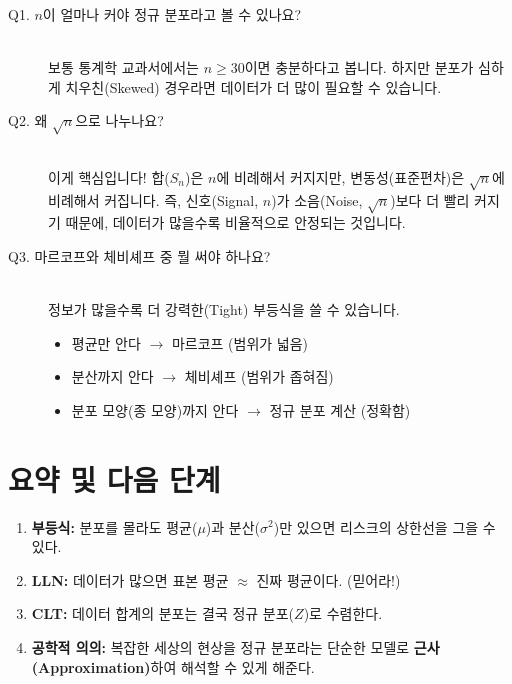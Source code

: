 \documentclass[11pt,a4paper]{book}
\theoremstyle{definition}
\begin{document}
\begin{description}
    \item[Q1. $n$이 얼마나 커야 정규 분포라고 볼 수 있나요?] \hfill \\
    보통 통계학 교과서에서는 \textbf{$n \ge 30$}이면 충분하다고 봅니다. 하지만 분포가 심하게 치우친(Skewed) 경우라면 데이터가 더 많이 필요할 수 있습니다.
    
    \item[Q2. 왜 $\sqrt{n}$으로 나누나요?] \hfill \\
    이게 핵심입니다! 합($S_n$)은 $n$에 비례해서 커지지만, 변동성(표준편차)은 $\sqrt{n}$에 비례해서 커집니다.
    즉, 신호(Signal, $n$)가 소음(Noise, $\sqrt{n}$)보다 더 빨리 커지기 때문에, 데이터가 많을수록 비율적으로 안정되는 것입니다.
    
    \item[Q3. 마르코프와 체비셰프 중 뭘 써야 하나요?] \hfill \\
    정보가 많을수록 더 강력한(Tight) 부등식을 쓸 수 있습니다.
    \begin{itemize}
        \item 평균만 안다 $\to$ 마르코프 (범위가 넓음)
        \item 분산까지 안다 $\to$ 체비셰프 (범위가 좁혀짐)
        \item 분포 모양(종 모양)까지 안다 $\to$ 정규 분포 계산 (정확함)
    \end{itemize}
\end{description}

\section{요약 및 다음 단계}

\begin{tcolorbox}[colback=mainblue!10, colframe=mainblue, title={\textbf{📝 Unit 3-1 핵심 요약}}]
\begin{enumerate}
    \item \textbf{부등식:} 분포를 몰라도 평균($\mu$)과 분산($\sigma^2$)만 있으면 리스크의 상한선을 그을 수 있다.
    \item \textbf{LLN:} 데이터가 많으면 표본 평균 $\approx$ 진짜 평균이다. (믿어라!)
    \item \textbf{CLT:} 데이터 합계의 분포는 결국 정규 분포($Z$)로 수렴한다.
    \item \textbf{공학적 의의:} 복잡한 세상의 현상을 정규 분포라는 단순한 모델로 \textbf{근사(Approximation)}하여 해석할 수 있게 해준다.
\end{enumerate}
\end{tcolorbox}
\end{document}
